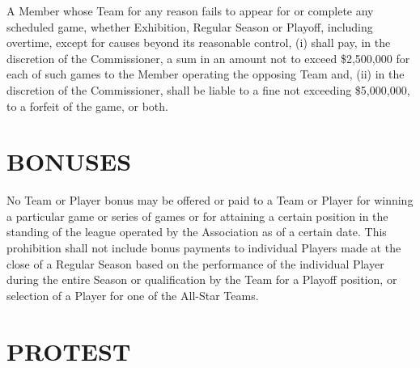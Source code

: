 \documentclass[]{book}
\begin{document}
A Member whose Team for any reason fails to appear for or complete any scheduled game, whether Exhibition, Regular Season or Playoff, including overtime, except for causes beyond its reasonable control, (i) shall pay, in the discretion of the Commissioner, a sum in an amount not to exceed \$2,500,000 for each of such games to the Member operating the opposing Team and, (ii) in the discretion of the Commissioner, shall be liable to a fine not exceeding \$5,000,000, to a forfeit of the game, or both.

\hypertarget{bonuses}{%
\section{BONUSES}\label{bonuses}}

No Team or Player bonus may be offered or paid to a Team or Player for winning a particular game or series of games or for attaining a certain position in the standing of the league operated by the Association as of a certain date. This prohibition shall not include bonus payments to individual Players made at the close of a Regular Season based on the performance of the individual Player during the entire Season or qualification by the Team for a Playoff position, or selection of a Player for one of the All-Star Teams.

\hypertarget{protest}{%
\section{PROTEST}\label{protest}}
\end{document}
